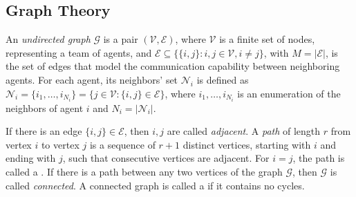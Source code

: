\subsection{Graph Theory}

An \textit{undirected graph} $\mathcal{G}$ is a pair
$(\mathcal{V}, \mathcal{E})$, where $\mathcal{V}$ is a finite set of nodes,
representing a team of agents, and
$\mathcal{E} \subseteq \{ \{i,j\} : i,j \in \mathcal{V}, i \neq j\}$,
with $M = |\mathcal{E}|$, is the set of edges that model the communication
capability between neighboring agents. For each agent, its neighbors' set
$\mathcal{N}_i$ is defined as
$\mathcal{N}_i = \{i_1, \ldots, i_{N_i}\} = \{ j \in \mathcal{V} : \{i,j\} \in \mathcal{E}\}$,
where $i_1, \ldots, i_{N_i}$ is an enumeration of the neighbors of agent $i$
and $N_i = |\mathcal N_i|$.

If there is an edge $\{i, j\} \in \mathcal{E}$, then $i, j$ are called
\textit{adjacent}. A \textit{path} of length $r$ from vertex $i$ to vertex
$j$ is a sequence of $r+1$ distinct vertices, starting with $i$ and ending
with $j$, such that consecutive vertices are adjacent. For $i = j$, the path
is called a . If there is a path between any two vertices of the
graph $\mathcal{G}$, then $\mathcal{G}$ is called \textit{connected}.
A connected graph is called a  if it contains no cycles.
